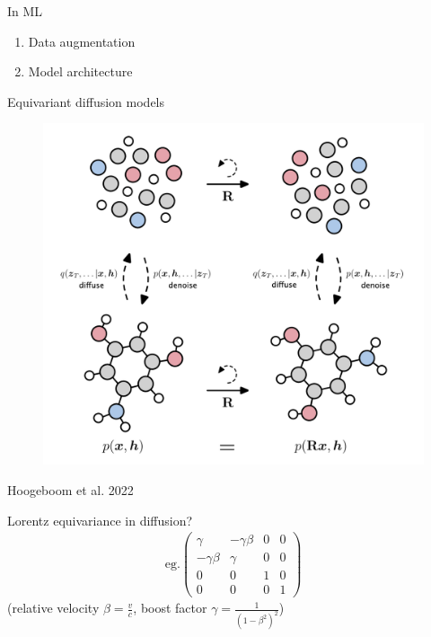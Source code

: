 \documentclass[handout, aspectratio=169,xcolor=dvipsnames]{beamer}
\begin{document}
\begin{frame}{In ML}
  \begin{enumerate}
    \item Data augmentation
    \pause
    \item Model architecture
  \end{enumerate}
\end{frame}

\begin{frame}{Equivariant diffusion models}
    \begin{figure}
    \centering
    \includegraphics[height=0.75\textheight]{figs/equivariant-rotation-pcloud-molecule-Hoogeboom2022}
  \end{figure}
  \centering  
  \small{Hoogeboom et al. 2022}
\end{frame}

\begin{frame}{Lorentz equivariance in diffusion?}  
  \pause
  \begin{align*}
    \text{eg.} \begin{pmatrix}
      \gamma & -\gamma \beta & 0 & 0\\
      -\gamma \beta & \gamma & 0 & 0\\
      0 & 0 & 1 & 0\\
      0 & 0 & 0 & 1
    \end{pmatrix}
  \end{align*}
  \centering
  (relative velocity $\beta = \frac{v}{c}$, boost factor $\gamma = \frac{1}{(1-\beta^2)^2}$)
\end{frame}
\end{document}
